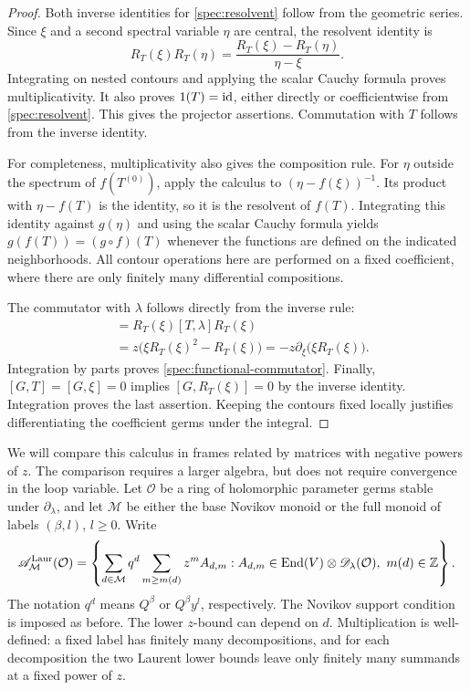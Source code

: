 \begin{proof}
Both inverse identities for \eqref{spec:resolvent} follow from the
geometric series.  Since $\xi$ and a second spectral variable $\eta$
are central, the resolvent identity is
\[
 R_T(\xi)R_T(\eta)
       =\frac{R_T(\xi)-R_T(\eta)}{\eta-\xi}.
\]
Integrating on nested contours and applying the scalar Cauchy formula
proves multiplicativity.  It also proves $1(T)=\operatorname{id}$, either directly
or coefficientwise from \eqref{spec:resolvent}.  This gives the
projector assertions.  Commutation with $T$ follows from the inverse
identity.

For completeness, multiplicativity also gives the composition rule.
For $\eta$ outside the spectrum of $f(T^{(0)})$, apply the calculus to
$(\eta-f(\xi))^{-1}$.  Its product with $\eta-f(T)$ is the identity,
so it is the resolvent of $f(T)$.  Integrating this identity against
$g(\eta)$ and using the scalar Cauchy formula yields
$g(f(T))=(g\circ f)(T)$ whenever the functions are defined on the
indicated neighborhoods.  All contour operations here are performed
on a fixed coefficient, where there are only finitely many
differential compositions.

The commutator with $\lambda$ follows directly from the inverse rule:
\begin{align*}
 [R_T(\xi),\lambda]
   &=R_T(\xi)[T,\lambda]R_T(\xi)\\
   &=z\bigl(\xi R_T(\xi)^2-R_T(\xi)\bigr)
     =-z\partial_\xi\bigl(\xi R_T(\xi)\bigr).
\end{align*}
Integration by parts proves \eqref{spec:functional-commutator}.
Finally, $[G,T]=[G,\xi]=0$ implies $[G,R_T(\xi)]=0$ by the
inverse identity.  Integration proves the last assertion.  Keeping
the contours fixed locally justifies differentiating the coefficient
germs under the integral.
\end{proof}

We will compare this calculus in frames related by matrices with
negative powers of $z$.  The comparison requires a larger algebra,
but does not require convergence in the loop variable.  Let $\mathcal
O$ be a ring of holomorphic parameter germs stable under
$\partial_\lambda$, and let $\mathcal M$ be either the base Novikov
monoid or the full monoid of labels $(\beta,l)$, $l\geq0$.  Write
\begin{equation}
 \mathscr A^{\mathrm{Laur}}_{\mathcal M}(\mathcal O)
 =\left\{\sum_{d\in\mathcal M}q^d
       \sum_{m\geq m(d)}z^m A_{d,m}:
       A_{d,m}\in\operatorname{End}(V)\otimes\mathscr D_\lambda(\mathcal O),
       \ m(d)\in\mathbb Z\right\}.
 \label{spec:laurent-algebra}
\end{equation}
The notation $q^d$ means $Q^\beta$ or $Q^\beta y^l$, respectively.
The Novikov support condition is imposed as before.  The lower
$z$-bound can depend on $d$.  Multiplication is well-defined: a fixed
label has finitely many decompositions, and for each decomposition
the two Laurent lower bounds leave only finitely many summands at a
fixed power of $z$.

